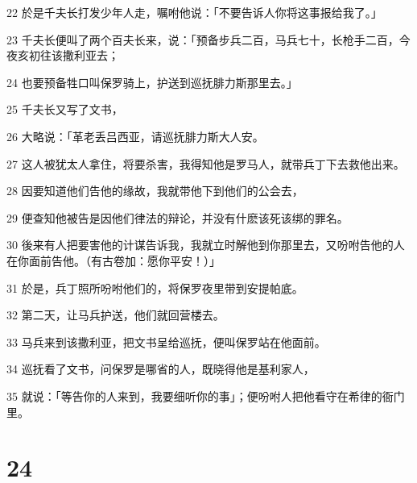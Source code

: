 \par 22 於是千夫长打发少年人走，嘱咐他说：「不要告诉人你将这事报给我了。」
\par 23 千夫长便叫了两个百夫长来，说：「预备步兵二百，马兵七十，长枪手二百，今夜亥初往该撒利亚去；
\par 24 也要预备牲口叫保罗骑上，护送到巡抚腓力斯那里去。」
\par 25 千夫长又写了文书，
\par 26 大略说：「革老丢吕西亚，请巡抚腓力斯大人安。
\par 27 这人被犹太人拿住，将要杀害，我得知他是罗马人，就带兵丁下去救他出来。
\par 28 因要知道他们告他的缘故，我就带他下到他们的公会去，
\par 29 便查知他被告是因他们律法的辩论，并没有什麽该死该绑的罪名。
\par 30 後来有人把要害他的计谋告诉我，我就立时解他到你那里去，又吩咐告他的人在你面前告他。（有古卷加：愿你平安！）」
\par 31 於是，兵丁照所吩咐他们的，将保罗夜里带到安提帕底。
\par 32 第二天，让马兵护送，他们就回营楼去。
\par 33 马兵来到该撒利亚，把文书呈给巡抚，便叫保罗站在他面前。
\par 34 巡抚看了文书，问保罗是哪省的人，既晓得他是基利家人，
\par 35 就说：「等告你的人来到，我要细听你的事」；便吩咐人把他看守在希律的衙门里。

\chapter{24}


